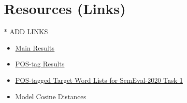 \section{Resources (Links)}
\label{app-resources}

* ADD LINKS
\begin{itemize}

  \item \href{https://github.com/kateviloria/Semantic-Change-Thesis/blob/main/results/MAIN_ALL.csv}{Main Results}
  \item \href{https://github.com/kateviloria/Semantic-Change-Thesis/blob/main/results/postag-results/MAIN_POS_RESULTS.csv}{POS-tag Results}
  \item \href{https://github.com/kateviloria/Semantic-Change-Thesis/tree/main/truth-labels}{POS-tagged Target Word Lists for SemEval-2020 Task 1}
  \item Model Cosine Distances

\end{itemize}